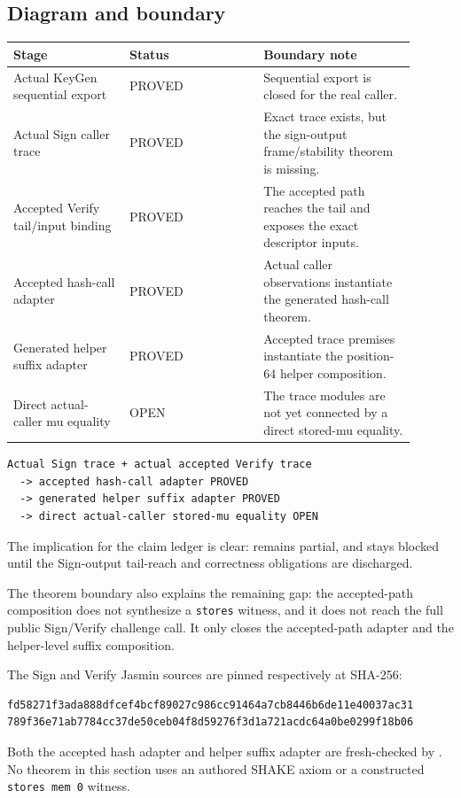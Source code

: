 \subsection{Diagram and boundary}

\begin{center}
\small
\begin{tabular}{p{0.26\linewidth}p{0.30\linewidth}p{0.34\linewidth}}
\toprule
Stage & Status & Boundary note \\
\midrule
Actual KeyGen sequential export & PROVED & Sequential export is closed for the real caller. \\
Actual Sign caller trace & PROVED & Exact trace exists, but the sign-output frame/stability theorem is missing. \\
Accepted Verify tail/input binding & PROVED & The accepted path reaches the tail and exposes the exact descriptor inputs. \\
Accepted hash-call adapter & PROVED & Actual caller observations instantiate the generated hash-call theorem. \\
Generated helper suffix adapter & PROVED & Accepted trace premises instantiate the position-64 helper composition. \\
Direct actual-caller mu equality & OPEN & The trace modules are not yet connected by a direct stored-mu equality. \\
\bottomrule
\end{tabular}
\end{center}

\begin{verbatim}
Actual Sign trace + actual accepted Verify trace
  -> accepted hash-call adapter PROVED
  -> generated helper suffix adapter PROVED
  -> direct actual-caller stored-mu equality OPEN
\end{verbatim}

The implication for the claim ledger is clear:
 remains partial, and
 stays blocked until the Sign-output
tail-reach and correctness obligations are discharged.

The theorem boundary also explains the remaining gap: the accepted-path
composition does not synthesize a \texttt{stores} witness, and it does not
reach the full public Sign/Verify challenge call.  It only closes the
accepted-path adapter and the helper-level suffix composition.

The Sign and Verify Jasmin sources are pinned respectively at SHA-256:
\begin{verbatim}
fd58271f3ada888dfcef4bcf89027c986cc91464a7cb8446b6de11e40037ac31
789f36e71ab7784cc37de50ceb04f8d59276f3d1a721acdc64a0be0299f18b06
\end{verbatim}
Both the accepted hash adapter and helper suffix adapter are fresh-checked by
.  No theorem in this section uses an authored
SHAKE axiom or a constructed \texttt{stores mem 0} witness.
